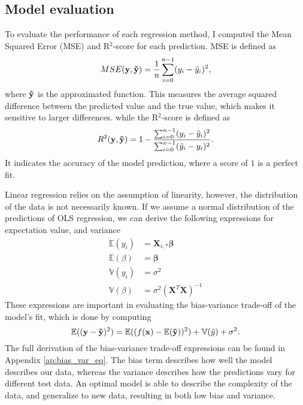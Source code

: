 \subsection{Model evaluation}\label{ssec:evaluation}
To evaluate the performance of each regression method, I computed the Mean Squared Error (MSE) and R$^{2}$-score for each prediction. MSE is defined as
\begin{equation}\label{eq:mse}
    MSE(\mathbf{y}, \mathbf{\Tilde{y}}) = \frac{1}{n} \sum_{i=0}^{n-1} (y_{i} - \Tilde{y}_{i})^{2},
\end{equation}
where $\mathbf{\Tilde{y}}$ is the approximated function. This measures the average squared difference between the predicted value and the true value, which makes it sensitive to larger differences. while the R$^{2}$-score is defined as
\begin{equation}\label{eq:r2}
    R^{2}(\mathbf{y}, \mathbf{\Tilde{y}}) = 1 - \frac{\sum_{i=0}^{n-1} (y_{i} - \Tilde{y}_{i})^{2}}{\sum_{i=0}^{n-1} (\Tilde{y}_{i} - y_{i})^{2}}.
\end{equation}
It indicates the accuracy of the model prediction, where a score of $1$ is a perfect fit.

Linear regression relies on the assumption of linearity, however, the distribution of the data is not necessarily known. If we assume a normal distribution of the predictions of OLS regression, we can derive the following expressions for expectation value, and variance
\begin{align}
    \label{eq:expected_y}
    \mathbb{E}(y_{i}) &= \mathbf{X}_{i, *} \mathbf{\beta} \\
    \label{eq:expected_beta}
    \mathbb{E}(\beta) &= \mathbf{\beta} \\
    \label{eq:variance_y}
    \mathbb{V}(y_{i}) &= \sigma^{2} \\
    \label{eq:variance_beta}
    \mathbb{V}(\beta) &= \sigma^{2} (\mathbf{X}^{T} \mathbf{X})^{-1} 
\end{align}
These expressions are important in evaluating the bias-variance trade-off of the model's fit, which is done by computing 
\begin{equation}
    \mathbb{E}((\mathbf{y} - \mathbf{\Tilde{y}})^{2}) = \mathbb{E}((f(\mathbf{x}) - \mathbb{E}(\mathbf{\Tilde{y}}))^{2}) + \mathbb{V}(\Tilde{y}) + \sigma^{2} .
\end{equation}
The full derivation of the bias-variance trade-off expressions can be found in Appendix \ref{ap:bias_var_eq}. The bias term describes how well the model describes our data, whereas the variance describes how the predictions vary for different test data. An optimal model is able to describe the complexity of the data, and generalize to new data, resulting in both low bias and variance.


